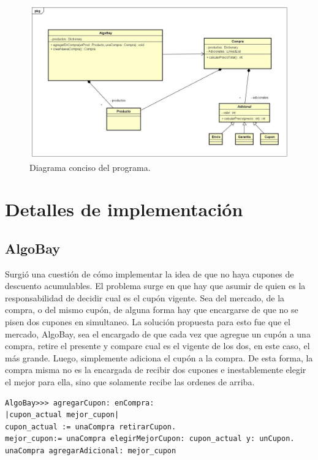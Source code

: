 \documentclass[titlepage,a4paper]{article}
\begin{document}
\begin{figure}[H]
\centering
\includegraphics[width=1\textwidth]{0clases.jpg} 
\caption{\label{fig:class01}Diagrama conciso del programa.}
\end{figure}

\section{Detalles de implementación}\label{sec:implementacion}

\subsection{AlgoBay}
Surgió una cuestión de cómo implementar la idea de que no haya cupones de descuento acumulables. El problema surge en que hay que asumir de quien es la responsabilidad de decidir cual es el cupón vigente. Sea del mercado, de la compra, o del mismo cupón, de alguna forma hay que encargarse de que no se pisen dos cupones en simultaneo. La solución propuesta para esto fue que el mercado, AlgoBay, sea el encargado de que cada vez que agregue un cupón a una compra, retire el presente y compare cual es el vigente de los dos, en este caso, el más grande. Luego, simplemente adiciona el cupón a la compra. De esta forma, la compra misma no es la encargada de recibir dos cupones e inestablemente elegir el mejor para ella, sino que solamente recibe las ordenes de arriba.

\begin{verbatim}
AlgoBay>>> agregarCupon: enCompra:
|cupon_actual mejor_cupon|
cupon_actual := unaCompra retirarCupon.
mejor_cupon:= unaCompra elegirMejorCupon: cupon_actual y: unCupon.
unaCompra agregarAdicional: mejor_cupon
\end{verbatim}
\end{document}
